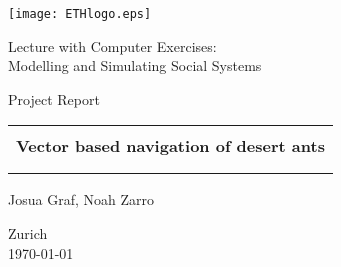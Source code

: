 
\thispagestyle{empty}

\begin{center}
\texttt{[image: ETHlogo.eps]}

\bigskip


\bigskip


\bigskip


\LARGE{ 	Lecture with Computer Exercises:\\ }
\LARGE{ Modelling and Simulating Social Systems\\}

\bigskip

\bigskip

\small{Project Report}\\

\bigskip

\bigskip

\bigskip

\bigskip


\begin{tabular}{|c|}
\hline
\\
\textbf{\LARGE{Vector based navigation of desert ants}}\\
\textbf{\LARGE{}}\\
\\
\hline
\end{tabular}
\bigskip

\bigskip

\bigskip

\LARGE{Josua Graf, Noah Zarro}



\bigskip

\bigskip

\bigskip

\bigskip

\bigskip

\bigskip

\bigskip

\bigskip

Zurich\\
\today

\end{center}


